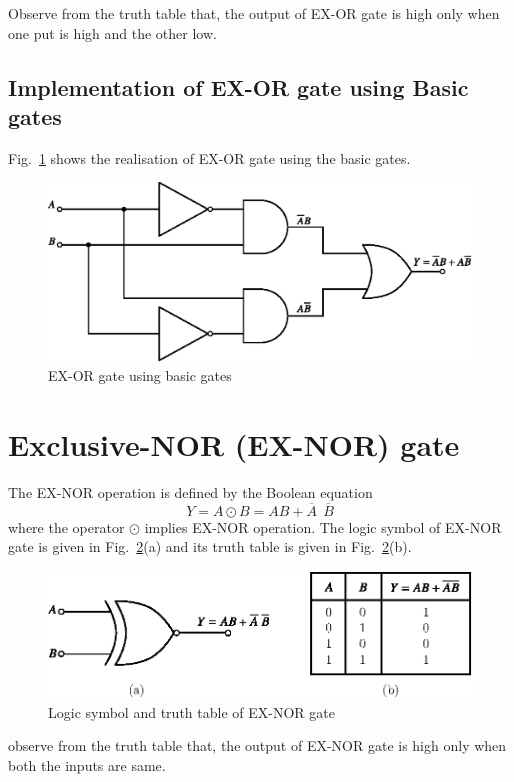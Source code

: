 Observe from the truth table that, the output of EX-OR gate is high only when one put is high and the other low.

\eject

\subsection{Implementation of EX-OR gate using Basic gates}\label{sec6.24.1}

Fig.~\ref{fig6.23} shows the realisation of EX-OR gate using the basic gates.
\begin{figure}[H]
\centering
\includegraphics{chap6/fig95_6.23.eps}
\caption{EX-OR gate using basic gates}\label{fig6.23}
\end{figure}

\section{Exclusive-NOR (EX-NOR) gate}\label{sec6.25}

The EX-NOR operation is defined by the Boolean equation
$$
Y=A\odot B=AB+\overline{A} \ \ \overline{B}
$$
where the operator $\odot$ implies EX-NOR operation. The logic symbol of EX-NOR gate is given in Fig.~\ref{fig6.24}(a) and its truth table is given in Fig.~\ref{fig6.24}(b).
\begin{figure}[H]
\centering
\includegraphics{chap6/fig96_6.24a.eps}
\caption{Logic symbol and truth table of EX-NOR gate}\label{fig6.24}
\end{figure}
\noindent
observe from the truth table that, the output of EX-NOR gate is high only when both the inputs are same.

